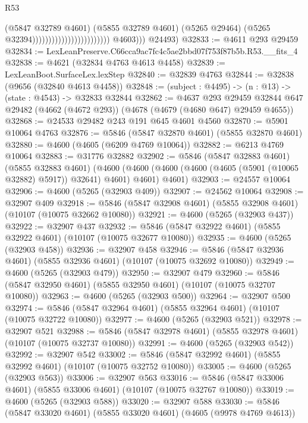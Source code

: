 \begin{lexlean}{R53}
\begin{coremodule}
                                                          (@5847 @32789 @4601)
                                                          (@5855 @32789 @4601)
                                                          (@5265 @29464)
                                                          (@5265 @32394))))))))))))))))))))))))
            @4603)))
      @24493)
@32833 := @4611 @293 @29459
@32834 := LexLeanPreserve.C66cca9ac7fc4c5ae2bbd07f753f87b5b.R53.__fits_4
@32838 := @4621 (@32834 @4763 @4613 @4458)
@32839 := LexLeanBoot.SurfaceLex.lexStep
@32840 := @32839 @4763
@32844 := @32838 (@9656 (@32840 @4613 @4458))
@32848 := (subject : @4495) -> (n : @13) -> (state : @4543) -> @32833 @32844
@32862 := @4637
    @293
    @29459
    @32844
    @647
    @29482
    (@4662 (@4672 @293))
    (@4678 (@4679 (@4680 @647) @29459 @4655))
@32868 := @24533 @29482 @243 @191 @645 @4601 @4560
@32870 := @5901 @10064 @4763
@32876 := @5846 (@5847 @32870 @4601) (@5855 @32870 @4601)
@32880 := @4600 (@4605 (@6209 @4769 @10064))
@32882 := @6213 @4769 @10064
@32883 := @31776 @32882
@32902 := @5846
    (@5847 @32883 @4601)
    (@5855 @32883 @4601)
    (@4600 (@4600 (@4600 (@4600 (@4605 (@5901 (@10065 @32882) @5917)) @32641) @4601) @4601) @4601)
@32903 := @24557 @10064
@32906 := @4600 (@5265 (@32903 @409))
@32907 := @24562 @10064
@32908 := @32907 @409
@32918 := @5846 (@5847 @32908 @4601) (@5855 @32908 @4601) (@10107 (@10075 @32662 @10080))
@32921 := @4600 (@5265 (@32903 @437))
@32922 := @32907 @437
@32932 := @5846 (@5847 @32922 @4601) (@5855 @32922 @4601) (@10107 (@10075 @32677 @10080))
@32935 := @4600 (@5265 (@32903 @458))
@32936 := @32907 @458
@32946 := @5846 (@5847 @32936 @4601) (@5855 @32936 @4601) (@10107 (@10075 @32692 @10080))
@32949 := @4600 (@5265 (@32903 @479))
@32950 := @32907 @479
@32960 := @5846 (@5847 @32950 @4601) (@5855 @32950 @4601) (@10107 (@10075 @32707 @10080))
@32963 := @4600 (@5265 (@32903 @500))
@32964 := @32907 @500
@32974 := @5846 (@5847 @32964 @4601) (@5855 @32964 @4601) (@10107 (@10075 @32722 @10080))
@32977 := @4600 (@5265 (@32903 @521))
@32978 := @32907 @521
@32988 := @5846 (@5847 @32978 @4601) (@5855 @32978 @4601) (@10107 (@10075 @32737 @10080))
@32991 := @4600 (@5265 (@32903 @542))
@32992 := @32907 @542
@33002 := @5846 (@5847 @32992 @4601) (@5855 @32992 @4601) (@10107 (@10075 @32752 @10080))
@33005 := @4600 (@5265 (@32903 @563))
@33006 := @32907 @563
@33016 := @5846 (@5847 @33006 @4601) (@5855 @33006 @4601) (@10107 (@10075 @32767 @10080))
@33019 := @4600 (@5265 (@32903 @588))
@33020 := @32907 @588
@33030 := @5846 (@5847 @33020 @4601) (@5855 @33020 @4601) (@4605 (@9978 @4769 @4613))

\end{coremodule}
\end{lexlean}
